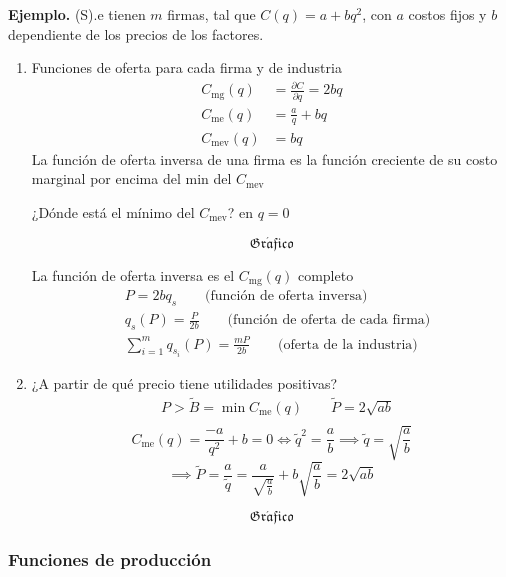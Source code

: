 \documentclass{report}
\newcommand{\GRAF}{\begin{center}$$\mathfrak{Gr\acute{a}fico}$$\end{center}}
\newenvironment{example}[1]{\noindent\setlength{\parskip}{0pt}\textbf{Ejemplo.} (#1).}{}
\begin{document}
\begin{example}
    Se tienen $m$ firmas, tal que $C\!\left( q \right) = a + bq^2$, con $a$ costos fijos y $b$ dependiente de los precios de los factores.
    \begin{enumerate}
    \item Funciones de oferta para cada firma y de industria
        \begin{align*}
            C_\text{mg}\!\left( q \right) &= \frac{\partial C}{\partial q}  = 2bq \\
            C_\text{me}\!\left( q \right) &= \frac{a}{q} + bq \\
            C_\text{mev}\!\left( q \right) &= bq
        \end{align*}
        La función de oferta inversa de una firma es la función creciente de su costo marginal por encima del min del $C_\text{mev}$

        ¿Dónde está el mínimo del $C_\text{mev}$? en $q=0$
        \GRAF
        La función de oferta inversa es el $C_\text{mg}\!\left( q \right) $ completo
        \begin{align*}
            &P = 2bq_{s} \qquad \text{(función de oferta inversa)}\\
            &q_s\!\left( P \right) = \frac{P}{2b} \qquad \text{(función de oferta de cada firma)}\\ 
            &\sum_{i=1}^{m} q_{s_i}\!\left( P \right) = \frac{mP}{2b} \qquad \text{(oferta de la industria)}
        \end{align*}
    \item ¿A partir de qué precio tiene utilidades positivas?
        \[
            \begin{aligned}
            &P > \tilde{B} = \min C_\text{me}\!\left( q \right) \qquad \tilde{P} = 2\sqrt{ab} \\
            \end{aligned}
        \] 
        \[
            C_\text{me}\!\left( q \right) = \frac{-a}{q^2} + b = 0 \iff \tilde{q}^2 = \frac{a}{b} \implies \tilde{q} = \sqrt{\frac{a}{b}} 
        \]
        \[
            \implies \tilde{P} = \frac{a}{\tilde{q}} = \frac{a}{\sqrt{\frac{a}{b}} } + b \sqrt{\frac{a}{b}} = 2\sqrt{ab} 
        \] 
        \GRAF
    \end{enumerate}
\end{example}

\subsubsection{Funciones de producción}
\end{document}
